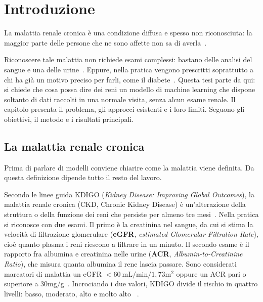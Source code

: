 \documentclass[a4paper, 12pt, oneside]{book}
\begin{document}
\chapter{Introduzione}
La malattia renale cronica è una condizione diffusa e spesso non riconosciuta: la maggior parte delle persone che ne sono  affette non sa di averla~\cite{centers_for_disease_and_prevention_chronic_2026,wang_prevalence_2023}.

Riconoscere tale malattia non richiede esami complessi: bastano delle analisi del sangue e una delle urine~\cite{centers_for_disease_and_prevention_chronic_2026}. Eppure, nella pratica vengono prescritti soprattutto a chi ha già un motivo preciso per farli, come il diabete~\cite{stevens_kdigo_2024,centers_for_disease_and_prevention_chronic_2026,american_diabetes_association_professional_practice_committee_11_2024}. Questa tesi parte da qui: si chiede che cosa possa dire dei reni un modello di machine learning che dispone soltanto di dati raccolti in una normale visita, senza alcun esame renale. Il capitolo presenta il problema, gli approcci esistenti e i loro limiti. Seguono gli obiettivi, il metodo e i risultati principali.

\section{La malattia renale cronica}
Prima di parlare di modelli conviene chiarire come la malattia viene definita. Da questa definizione dipende tutto il resto del lavoro.

Secondo le linee guida KDIGO (\textit{Kidney Disease: Improving Global Outcomes}), la malattia renale cronica (CKD, Chronic Kidney Disease) è un'alterazione della struttura o della funzione dei reni che persiste per almeno tre mesi~\cite{stevens_kdigo_2024}. Nella pratica si riconosce con due esami. Il primo è la creatinina nel sangue, da cui si stima la velocità di filtrazione glomerulare (\textbf{eGFR}, \textit{estimated Glomerular Filtration Rate}), cioè quanto plasma i reni riescono a filtrare in un minuto. Il secondo esame è il rapporto fra albumina e creatinina nelle urine (\textbf{ACR}, \textit{Albumin-to-Creatinine Ratio}), che misura quanta albumina il rene lascia passare. Sono considerati marcatori di malattia un eGFR $< \SI{60}{\milli\liter\per\minute\per1,73\meter\squared}$ oppure un ACR pari o superiore a $30 \text{mg/g}$~\cite{stevens_kdigo_2024}. Incrociando i due valori, KDIGO divide il rischio in quattro livelli: basso, moderato, alto e molto alto ~\cite{stevens_kdigo_2024}.
\end{document}
